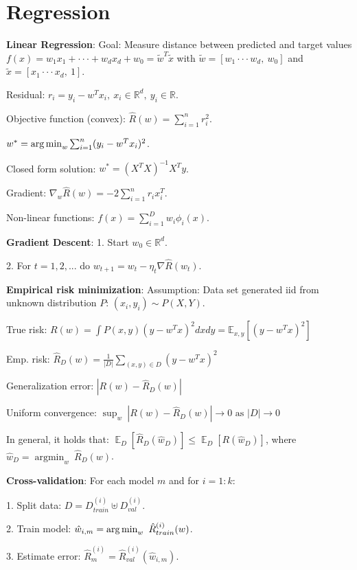 \section{Regression}
\textbf{Linear Regression}: Goal: Measure distance between predicted and target values
$f(x) = w_1 x_1 + \cdot \cdot \cdot + w_d x_d + w_0 = \widetilde{w}^T \widetilde{x}$ with
$\widetilde{w} = [w_1 \cdot \cdot \cdot w_d,\ w_0 ]$ and $\widetilde{x} = [x_1 \cdot \cdot \cdot x_d,\ 1]$.

Residual: $r_i = y_i - w^T x_i,\ x_i \in \mathbb{R}^d,\ y_i \in \mathbb{R}$.

Objective function (convex): $\hat{R}(w) = \sum_{i=1}^n r_i^2$.

$w^* = \operatorname*{arg\,min}_w \sum_{i=1}^n (y_i - w^T x_i)^2$.

Closed form solution: $w^*=(X^T X)^{-1} X^T y$.

Gradient: $\nabla_w \hat{R}(w) =  -2 \sum_{i=1}^n r_i x_i^T$.

Non-linear functions: $f(x) = \sum_{i=1}^D w_i \phi_i(x)$.

\textbf{Gradient Descent}: 1. Start $w_0 \in \mathbb{R}^d$.

2. For $t = 1,2,...$ do $w_{t+1} = w_t - \eta_t \nabla \hat{R}(w_t)$.

\textbf{Empirical risk minimization}: Assumption: Data set generated iid from unknown distribution $P$: $(x_i , y_i) \sim P(X, Y).$

True risk: $R(w) = \int P(x,y) (y-w^Tx)^2 dx dy = \mathbb{E}_{x,y}[(y-w^Tx)^2]$

Emp. risk: $\hat{R}_D(w) = \frac{1}{|D|}\sum_{(x,y)\in D} (y-w^Tx)^2$

Generalization error: $|R(w) - \hat{R}_D(w)|$

Uniform convergence: $\operatorname{sup}_w\  |R(w) - \hat{R}_D(w)| \rightarrow 0 \text{ as } |D| \rightarrow 0$

In general, it holds that: $\mathop{\mathbb{E}}_D[\hat{R}_D(\hat{w}_D)] \leq \mathop{\mathbb{E}}_D[R(\hat{w}_D)]$, where $\hat{w}_D =  \operatorname{argmin}_w\ \hat{R}_D(w)$.

\textbf{Cross-validation}: For each model $m$ and for $i = 1:k$:

1. Split data: $D = D_{train}^{(i)} \uplus D_{val}^{(i)}$.

2. Train model: $\hat{w}_{i,m} = \argmin_w\ \hat{R}_{train}^{(i)}(w)$.

3. Estimate error: $\hat{R}_m^{(i)} =  \hat{R}_{val}^{(i)}(\hat{w}_{i,m})$.

